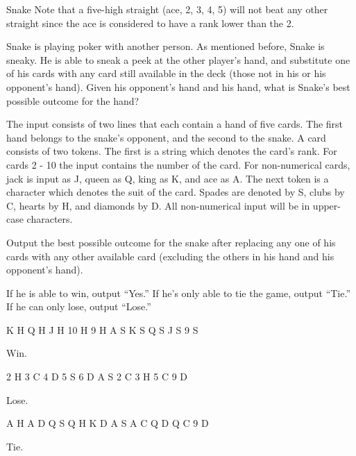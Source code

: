 \begin{problem}{Snake}
 Note that a five-high straight (ace, 2, 3, 4, 5) will not beat any other straight since the ace is considered to have a rank lower than the 2.
 
 Snake is playing poker with another person. As mentioned before, Snake is sneaky. He is able to sneak a peek at the other player's hand, and substitute one of his cards with any card still available in the deck (those not in his or his opponent's hand). Given his opponent's hand and his hand, what is Snake's best possible outcome for the hand?

\end{problem}

\begin{formalin}
The input consists of two lines that each contain a hand of five cards. 
The first hand belongs to the snake's opponent, and the second to the snake.
A card consists of two tokens. The first is a string which denotes the card's rank. 
For cards 2 - 10 the input contains the number of the card. For non-numerical cards, 
jack is input as J, queen as Q, king as K, and ace as A. The next token is a character 
which denotes the suit of the card. Spades are denoted by S, clubs by C, hearts by H, 
and diamonds by D. All non-numerical input will be in upper-case characters.
\end{formalin}

\begin{formalout}
Output the best possible outcome for the snake after replacing any one of his cards with 
any other available card (excluding the others in his hand and his opponent's hand). 

If he is able to win, output ``Yes.''
If he's only able to tie the game, output ``Tie.''
If he can only lose, output ``Lose.''
\end{formalout}

\begin{datain}
K H Q H J H 10 H 9 H
A S K S Q S J S 9 S
\end{datain}
\begin{dataout}
Win.
\end{dataout}

\begin{datain}
2 H 3 C 4 D 5 S 6 D
A S 2 C 3 H 5 C 9 D
\end{datain}
\begin{dataout}
Lose.
\end{dataout}

\begin{datain}
A H A D Q S Q H K D
A S A C Q D Q C 9 D
\end{datain}
\begin{dataout}
Tie.
\end{dataout}
